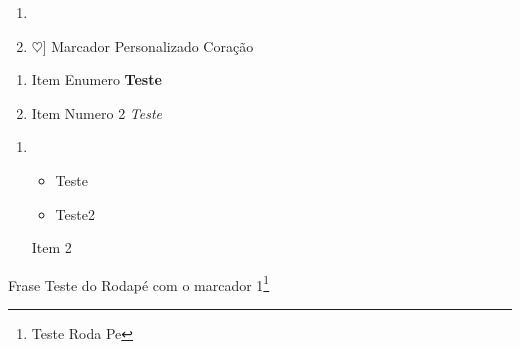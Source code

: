 \documentclass[12pt, a4paper, onside]{article}
\begin{document}
\begin{enumerate}
    \item %
    \item $\heartsuit$] Marcador Personalizado Coração
\end{enumerate}
\begin{enumerate}
    \item Item Enumero \textbf{Teste}
    \item Item Numero 2 \textit{Teste}
\end{enumerate}

\begin{enumerate}
    \item \begin{itemize}  
        \item Teste
        \item  Teste2
    \end{itemize}
    Item 2
\end{enumerate}



Frase Teste do Rodapé com o marcador 1\footnote{Teste Roda Pe}



\end{document}
